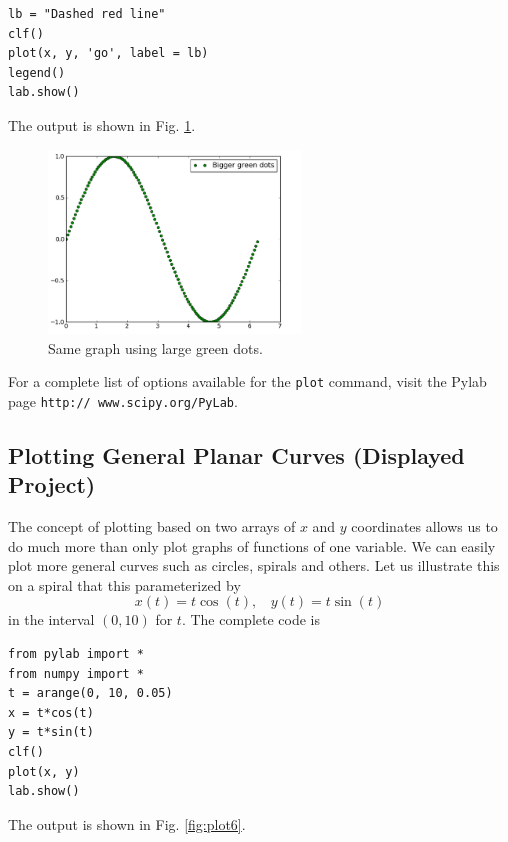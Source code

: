 \documentclass[article,A4,12pt]{llncs}
\begin{document}
\begin{verbatim}
lb = "Dashed red line"
clf()
plot(x, y, 'go', label = lb)
legend()
lab.show()
\end{verbatim}
The output is shown in Fig. \ref{fig:plot5}.

\begin{figure}[!ht]
\begin{center}
\includegraphics[width=0.6\textwidth]{img/plot5.png}
\end{center}
\vspace{-6mm}
\caption{Same graph using large green dots.}
\label{fig:plot5}
\vspace{-4mm}
\end{figure}
\noindent
For a complete list of options available for the {\tt plot} command, 
visit the Pylab page {\tt http:// www.scipy.org/PyLab}.

\subsection{Plotting General Planar Curves (Displayed Project)}

The concept of plotting based on two arrays of $x$ and $y$ coordinates
allows us to do much more than only plot graphs of functions of one variable.
We can easily plot more general curves such as circles, spirals and others.
Let us illustrate this on a spiral that this parameterized 
by 
$$
x(t) = t \cos(t), \ \ \ \ 
y(t) = t \sin(t)
$$ 
in the interval $(0, 10)$ for $t$. The complete code is

\begin{verbatim}
from pylab import *
from numpy import *
t = arange(0, 10, 0.05)
x = t*cos(t)
y = t*sin(t)
clf()
plot(x, y)
lab.show()
\end{verbatim}
The output is shown in Fig. \ref{fig:plot6}.
\end{document}
